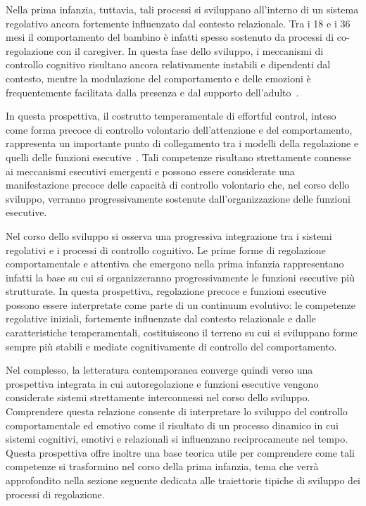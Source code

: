         Nella prima infanzia, tuttavia, tali processi si sviluppano all'interno di un sistema regolativo ancora fortemente influenzato dal contesto relazionale. Tra i 18 e i 36 mesi il comportamento del bambino è infatti spesso sostenuto da processi di co-regolazione con il caregiver. In questa fase dello sviluppo, i meccanismi di controllo cognitivo risultano ancora relativamente instabili e dipendenti dal contesto, mentre la modulazione del comportamento e delle emozioni è frequentemente facilitata dalla presenza e dal supporto dell'adulto~\cite{blair2015}.

        In questa prospettiva, il costrutto temperamentale di effortful control, inteso come forma precoce di controllo volontario dell'attenzione e del comportamento, rappresenta un importante punto di collegamento tra i modelli della regolazione e quelli delle funzioni esecutive~\cite{rothbart2006}. Tali competenze risultano strettamente connesse ai meccanismi esecutivi emergenti e possono essere considerate una manifestazione precoce delle capacità di controllo volontario che, nel corso dello sviluppo, verranno progressivamente sostenute dall'organizzazione delle funzioni esecutive.

        Nel corso dello sviluppo si osserva una progressiva integrazione tra i sistemi regolativi e i processi di controllo cognitivo. Le prime forme di regolazione comportamentale e attentiva che emergono nella prima infanzia rappresentano infatti la base su cui si organizzeranno progressivamente le funzioni esecutive più strutturate. In questa prospettiva, regolazione precoce e funzioni esecutive possono essere interpretate come parte di un continuum evolutivo: le competenze regolative iniziali, fortemente influenzate dal contesto relazionale e dalle caratteristiche temperamentali, costituiscono il terreno su cui si sviluppano forme sempre più stabili e mediate cognitivamente di controllo del comportamento.

        Nel complesso, la letteratura contemporanea converge quindi verso una prospettiva integrata in cui autoregolazione e funzioni esecutive vengono considerate sistemi strettamente interconnessi nel corso dello sviluppo. Comprendere questa relazione consente di interpretare lo sviluppo del controllo comportamentale ed emotivo come il risultato di un processo dinamico in cui sistemi cognitivi, emotivi e relazionali si influenzano reciprocamente nel tempo. Questa prospettiva offre inoltre una base teorica utile per comprendere come tali competenze si trasformino nel corso della prima infanzia, tema che verrà approfondito nella sezione seguente dedicata alle traiettorie tipiche di sviluppo dei processi di regolazione.

